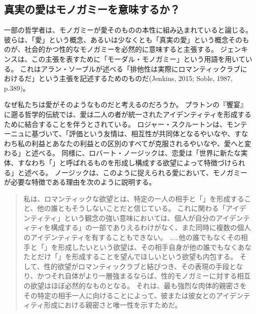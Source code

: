 \documentclass[paper=a4,book,openany]{jlreq}
\begin{document}
\subsection{真実の愛はモノガミーを意味するか？}

一部の哲学者は、モノガミーが愛そのものの本性に組み込まれていると論じる。
彼らは、「愛」という概念、あるいは少なくとも「真実の愛」という概念そのものが、社会的かつ性的なモノガミーを必然的に意味すると主張する\citep{mckeever17:_is_requir_sexual_exclus_consis_roman_love}。
ジェンキンスは、この主張を表すために「モーダル・モノガミー」という用語を用いている。
これはアラン・ソーブルが述べる「排他性は実際にロマンティックラブにおけるだ」という主張を記述するためのものだ(Jenkins, 2015; Soble, 1987, p.389)。
\nocite{jenkins15:_modal_monog}\nocite{soble87:_unity_roman_love}

なぜ私たちは愛がそのようなものだと考えるのだろうか。
プラトンの『饗宴』に遡る哲学的伝統では、愛は二人の者が統一されたアイデンティティを形成するために結合することを伴うとされている。
ロジャー・スクルートンは、モンテーニュに基づいて、「評価という友情は、相互性が共同体となるやいなや、すなわち私の利益とあなたの利益との区別のすべてが克服されるやいなや、愛へと変わる」と述べる。
同様に、ロバート・ノージックは、恋愛は「世界に新たな実体、すなわち「」と呼ばれるものを形成し構成する欲望によって特徴づけられる」と述べる\citep[p.230]{scruton06:_sexual_desir}。
ノージックは、このように捉えられる愛において、モノガミーが必要な特徴である理由を次のように説明する。

\begin{quote}
私は、ロマンティックな欲望とは、特定の一人の相手と「」を形成すること、他の誰ともそうしないことだと信じている。
これに関わる「アイデンティティ」という観念の強い意味においては、個人が自分のアイデンティティを構成する」の一部でありえるわけがなく、また同時に複数の個人のアイデンティティを有することもできない。
……他の誰でもなくその相手と「」を形成したいという欲望は、その相手自身が他の誰でもなくあなたとだけ「」を形成することを望んでほしいという欲望も内包する。
そして、性的欲望がロマンティックラブと結びつき、その表現の手段となり、かつそれ自体がより一層強まるならば、性的モノガミーに対する相互の欲望はほぼ必然的なものとなる。
それは、最も強烈な肉体的親密さをその特定の相手一人に向けることによって、彼または彼女とのアイデンティティ形成における親密さと唯一性を示すためだ。
\citep[p.89]{nozick89:_examined_life}
\end{quote}
\end{document}
